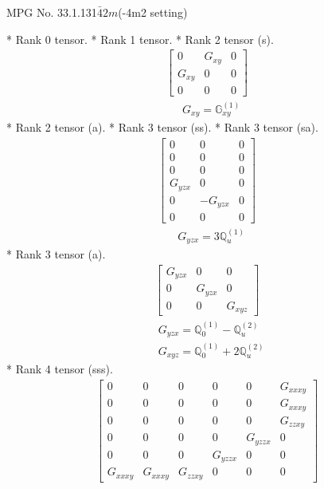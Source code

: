 \documentclass[fleqn,8pt,landscape]{jsarticle}
\begin{document}
\setcounter{MaxMatrixCols}{32}

\renewcommand{\tablename}{Table~}
\renewcommand{\figurename}{Figure~}
\begin{center}
\LARGE
MPG No. 33.1.131\quad$\bar{4}2m$\quad(-4m2 setting)
\end{center}
* Rank 0 tensor.
* Rank 1 tensor.
* Rank 2 tensor (s).
\begin{align*}
\begin{bmatrix} 0 & G_{xy} & 0 \\ G_{xy} & 0 & 0 \\ 0 & 0 & 0 \end{bmatrix}
\end{align*}
\begin{align*}
& G_{xy} = \mathbb{G}_{xy}^{(1)}
\end{align*}
* Rank 2 tensor (a).
* Rank 3 tensor (ss).
* Rank 3 tensor (sa).
\begin{align*}
\begin{bmatrix} 0 & 0 & 0 \\ 0 & 0 & 0 \\ 0 & 0 & 0 \\ G_{yzx} & 0 & 0 \\ 0 & - G_{yzx} & 0 \\ 0 & 0 & 0 \end{bmatrix}
\end{align*}
\begin{align*}
& G_{yzx} = 3 \mathbb{Q}_{u}^{(1)}
\end{align*}
* Rank 3 tensor (a).
\begin{align*}
\begin{bmatrix} G_{yzx} & 0 & 0 \\ 0 & G_{yzx} & 0 \\ 0 & 0 & G_{xyz} \end{bmatrix}
\end{align*}
\begin{align*}
& G_{yzx} = \mathbb{Q}_{0}^{(1)} - \mathbb{Q}_{u}^{(2)} \\
& G_{xyz} = \mathbb{Q}_{0}^{(1)} + 2 \mathbb{Q}_{u}^{(2)}
\end{align*}
* Rank 4 tensor (sss).
\begin{align*}
\begin{bmatrix} 0 & 0 & 0 & 0 & 0 & G_{xxxy} \\ 0 & 0 & 0 & 0 & 0 & G_{xxxy} \\ 0 & 0 & 0 & 0 & 0 & G_{zzxy} \\ 0 & 0 & 0 & 0 & G_{yzzx} & 0 \\ 0 & 0 & 0 & G_{yzzx} & 0 & 0 \\ G_{xxxy} & G_{xxxy} & G_{zzxy} & 0 & 0 & 0 \end{bmatrix}
\end{align*}
\end{document}
